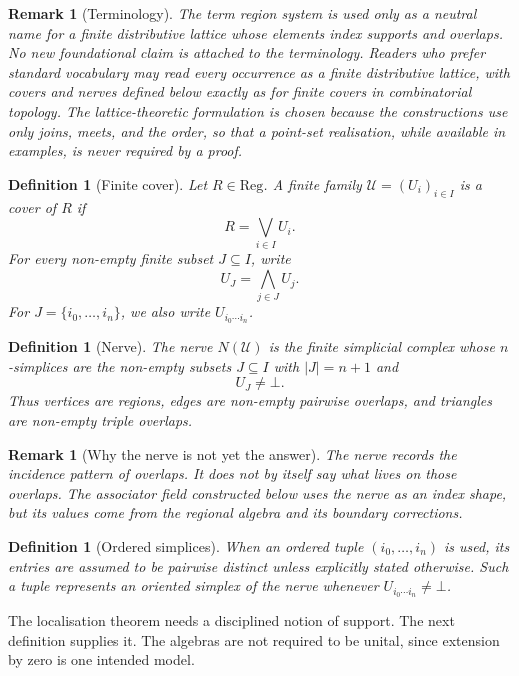 \documentclass[11pt]{article}
\newtheorem{definition}[theorem]{Definition}
\newtheorem{remark}[theorem]{Remark}
\newcommand{\Reg}{\mathrm{Reg}}
\begin{document}
\begin{remark}[Terminology]
The term region system is used only as a neutral name for a finite distributive lattice whose elements index supports and overlaps. No new foundational claim is attached to the terminology. Readers who prefer standard vocabulary may read every occurrence as a finite distributive lattice, with covers and nerves defined below exactly as for finite covers in combinatorial topology. The lattice-theoretic formulation is chosen because the constructions use only joins, meets, and the order, so that a point-set realisation, while available in examples, is never required by a proof.
\end{remark}

\begin{definition}[Finite cover]
Let \(R\in \Reg\). A finite family \(\mathcal U=(U_i)_{i\in I}\) is a cover of \(R\) if
\[
R=\bigvee_{i\in I}U_i.
\]
For every non-empty finite subset \(J\subseteq I\), write
\[
U_J=\bigwedge_{j\in J}U_j.
\]
For \(J=\{i_0,\ldots,i_n\}\), we also write \(U_{i_0\cdots i_n}\).
\end{definition}

\begin{definition}[Nerve]
The nerve \(N(\mathcal U)\) is the finite simplicial complex whose \(n\)-simplices are the non-empty subsets \(J\subseteq I\) with \(|J|=n+1\) and
\[
U_J\neq \bot.
\]
Thus vertices are regions, edges are non-empty pairwise overlaps, and triangles are non-empty triple overlaps.
\end{definition}

\begin{remark}[Why the nerve is not yet the answer]
The nerve records the incidence pattern of overlaps. It does not by itself say what lives on those overlaps. The associator field constructed below uses the nerve as an index shape, but its values come from the regional algebra and its boundary corrections.
\end{remark}

\begin{definition}[Ordered simplices]
When an ordered tuple \((i_0,\ldots,i_n)\) is used, its entries are assumed to be pairwise distinct unless explicitly stated otherwise. Such a tuple represents an oriented simplex of the nerve whenever \(U_{i_0\cdots i_n}\neq \bot\).
\end{definition}

The localisation theorem needs a disciplined notion of support. The next definition supplies it. The algebras are not required to be unital, since extension by zero is one intended model.
\end{document}
